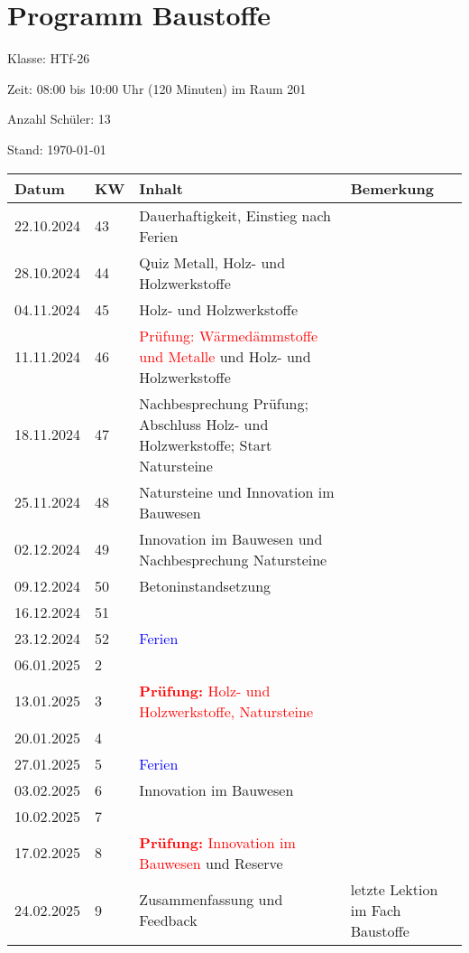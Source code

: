 \documentclass[
11pt,
captions=tableheading,
headings=big,
headsepline,
footsepline, 
captions=tableheading,
parskip=half-,
]{scrartcl}
\title{\fach}
\date{2024}
\newcommand{\klasse}{HTf-26\xspace}
\newcommand{\red}[1]{\textcolor{red}{#1}}
\begin{document}
\section*{Programm Baustoffe}

Klasse: \klasse

Zeit: 08:00 bis 10:00 Uhr (120 Minuten) im Raum 201

Anzahl Schüler: 13



Stand: \today

\vspace{0.75cm}



\begin{table}[H]
    \centering
    \begin{tabular}{llp{8.5cm}p{3.5cm}}
    \toprule
    Datum & KW  & Inhalt & Bemerkung \\
    \midrule
        22.10.2024 & 43 & Dauerhaftigkeit, Einstieg nach Ferien & {} \\
        28.10.2024 & 44 & Quiz Metall, Holz- und Holzwerkstoffe& {} \\
        04.11.2024 & 45 & Holz- und Holzwerkstoffe & {} \\
        11.11.2024 & 46 & \red{Prüfung: Wärmedämmstoffe und Metalle} und Holz- und Holzwerkstoffe & {} \\
        18.11.2024 & 47 & Nachbesprechung Prüfung; Abschluss Holz- und Holzwerkstoffe; Start Natursteine& {} \\
        25.11.2024 & 48 & Natursteine  und Innovation im Bauwesen & {} \\
        02.12.2024 & 49 & Innovation im Bauwesen und Nachbesprechung Natursteine& {} \\
        09.12.2024 & 50 & Betoninstandsetzung & {} \\
        16.12.2024 & 51 & {} & {} \\
        23.12.2024 & 52 & \textcolor{blue}{Ferien} & {} \\
        06.01.2025 & 2 & {} & {} \\
        13.01.2025 & 3 &  \red{\textbf{Prüfung:} Holz- und Holzwerkstoffe, Natursteine}  & {} \\
        20.01.2025 & 4 & {} & {} \\
        27.01.2025 & 5 & \textcolor{blue}{Ferien} & {} \\
        03.02.2025 & 6 & Innovation im Bauwesen & {} \\
        10.02.2025 & 7 & {} & {} \\
        17.02.2025 & 8 & \red{\textbf{Prüfung:} Innovation im Bauwesen} und Reserve & {} \\
        24.02.2025 & 9 & Zusammenfassung und Feedback & letzte Lektion im Fach Baustoffe\\
    \bottomrule
    \end{tabular}
\end{table}
\end{document}
